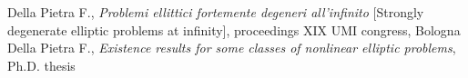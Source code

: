 \documentclass[11pt,a4paper,sans,colorlinks,linkcolor=green]{moderncv}
\begin{document}
 {Della Pietra F., \textit{Problemi ellittici fortemente degeneri
    all'infinito} [Strongly degenerate elliptic problems at infinity], proceedings XIX UMI congress, Bologna}
 {Della Pietra F., \textit{Existence results for some
    classes of nonlinear elliptic problems}, Ph.D. thesis}



\end{document}
